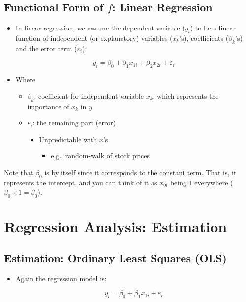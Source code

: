 \documentclass[10pt,article]{article}
\begin{document}
\subsection{Functional Form of \(f\): Linear Regression}
\label{sec:orgcacf982}
\begin{itemize}
\item In linear regression, we assume the dependent variable (\(y_{i}\)) to be a
linear function of independent (or explanatory) variables (\(x_{k}\)'s),
coefficients (\(\beta_{k}\)'s) and the error term (\(\varepsilon_{i}\)):

\[  y_{i} = \beta_0 + \beta_1 x_{1i} + \beta_2 x_{2i} + \varepsilon_{i} \]
\end{itemize}

\begin{itemize}
\item Where

\begin{itemize}
\item \(\beta_k\): coefficient for independent variable \(x_k\), which
represents the importance of \(x_{k}\) in \(y\)
\item \(\varepsilon_{i}\): the remaining part (error)

\begin{itemize}
\item Unpredictable with \(x\)'s
\begin{itemize}
\item e.g., random-walk of stock prices
\end{itemize}
\end{itemize}
\end{itemize}
\end{itemize}

\begin{mdframed}[frametitle={}]
Note that \(\beta_0\) is by itself since it corresponds to the constant term. That is, it 
represents the intercept, and you can think of it as \(x_{0i}\) being 1 everywhere 
(\(\beta_0 \times 1 = \beta_0\)).
\end{mdframed}
\section{Regression Analysis: Estimation}
\label{sec:orgd6312f0}
\subsection{Estimation: Ordinary Least Squares (OLS)}
\label{sec:org8b64bff}
\begin{itemize}
\item Again the regression model is:

\[  y_{i} = \beta_0 + \beta_1 x_{1i} + \varepsilon_{i} \]
\end{itemize}
\end{document}

